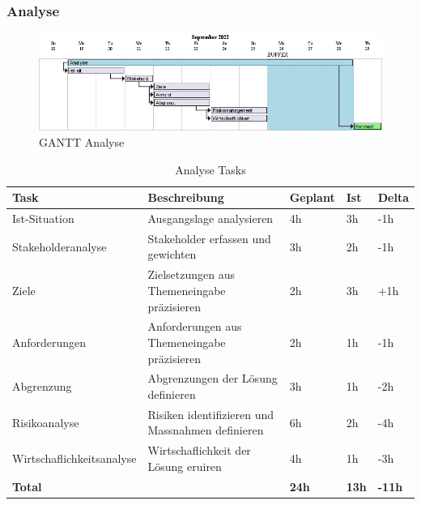  \subsubsection{Analyse}
  \begin{figure}[H]
    \begin{center}
      \includegraphics[width=1\linewidth]{../content/diagrams/gantt/analisisPlanning/analisisPlanning.png}
      \caption{GANTT Analyse}
    \end{center}
  \end{figure}
  \begin{table}[H]
    \centering
    \settowidth{}
    \setlength\extrarowheight{2pt}
    \begin{tabulary}{1.0\textwidth}{|L|L|L|L|L|}
      \hline
      \textbf{Task} &
      \textbf{Beschreibung} &
      \textbf{Geplant}&
      \textbf{Ist}&
      \textbf{Delta}\\
      \hline
      Ist-Situation &
      Ausgangslage analysieren &
      4h &
      3h &
      -1h\\
      \hline
      Stakeholderanalyse &
      Stakeholder erfassen und gewichten &
      3h &
      2h &
      -1h\\
      \hline
      Ziele &
      Zielsetzungen aus Themeneingabe präzisieren &
      2h &
      3h &
      +1h\\
      \hline
      Anforderungen &
      Anforderungen aus Themeneingabe präzisieren &
      2h &
      1h &
      -1h\\
      \hline
      Abgrenzung &
      Abgrenzungen der Lösung definieren &
      3h &
      1h &
      -2h\\
      \hline
      Risikoanalyse &
      Risiken identifizieren und Massnahmen definieren &
      6h &
      2h &
      -4h\\
      \hline
      Wirtschaflichkeitsanalyse &
      Wirtschaflichkeit der Lösung eruiren &
      4h &
      1h &
      -3h\\
      \hline
      \textbf{Total} &
       &
      \textbf{24h} &
      \textbf{13h} &
      \textbf{-11h} \\
      \hline
    \end{tabulary}
    \caption{Analyse Tasks}
  \end{table}

